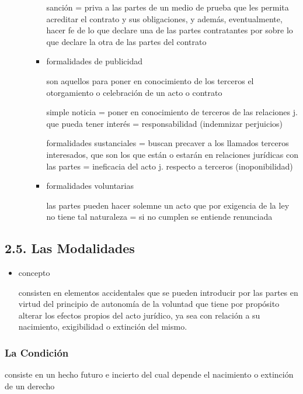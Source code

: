 \documentclass[]{article}
\begin{document}
\begin{itemize}
\begin{itemize}
\begin{itemize}
      sanción = priva a las partes de un medio de prueba que les permita
      acreditar el contrato y sus obligaciones, y además, eventualmente,
      hacer fe de lo que declare una de las partes contratantes por
      sobre lo que declare la otra de las partes del contrato
    \item
      formalidades de publicidad

      son aquellos para poner en conocimiento de los terceros el
      otorgamiento o celebración de un acto o contrato

      simple noticia = poner en conocimiento de terceros de las
      relaciones j. que pueda tener interés = responsabilidad
      (indemnizar perjuicios)

      formalidades sustanciales = buscan precaver a los llamados
      terceros interesados, que son los que están o estarán en
      relaciones jurídicas con las partes = ineficacia del acto j.
      respecto a terceros (inoponibilidad)
    \item
      formalidades voluntarias

      las partes pueden hacer solemne un acto que por exigencia de la
      ley no tiene tal naturaleza = si no cumplen se entiende renunciada
    \end{itemize}
  \end{itemize}
\end{itemize}

\hypertarget{las-modalidades}{%
\subsection{2.5. Las Modalidades}\label{las-modalidades}}

\begin{itemize}
\item
  concepto

  consisten en elementos accidentales que se pueden introducir por las
  partes en virtud del principio de autonomía de la voluntad que tiene
  por propósito alterar los efectos propios del acto jurídico, ya sea
  con relación a su nacimiento, exigibilidad o extinción del mismo.
\end{itemize}

\hypertarget{la-condiciuxf3n}{%
\subsubsection{La Condición}\label{la-condiciuxf3n}}

consiste en un hecho futuro e incierto del cual depende el nacimiento o
extinción de un derecho
\end{document}
